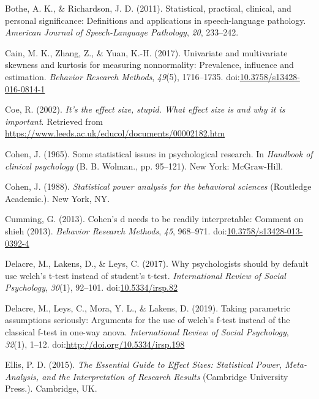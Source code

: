 \documentclass[
  man,floatsintext]{apa6}
\begin{document}
\leavevmode\hypertarget{ref-Bothe_Richardson_2011}{}%
Bothe, A. K., \& Richardson, J. D. (2011). Statistical, practical, clinical, and personal significance: Definitions and applications in speech-language pathology. \emph{American Journal of Speech-Language Pathology}, \emph{20}, 233--242.

\leavevmode\hypertarget{ref-Cain_et_al_2017}{}%
Cain, M. K., Zhang, Z., \& Yuan, K.-H. (2017). Univariate and multivariate skewness and kurtosis for measuring nonnormality: Prevalence, influence and estimation. \emph{Behavior Research Methods}, \emph{49}(5), 1716--1735. doi:\href{https://doi.org/10.3758/s13428-016-0814-1}{10.3758/s13428-016-0814-1}

\leavevmode\hypertarget{ref-Coe_2002}{}%
Coe, R. (2002). \emph{It's the effect size, stupid. What effect size is and why it is important}. Retrieved from \url{https://www.leeds.ac.uk/educol/documents/00002182.htm}

\leavevmode\hypertarget{ref-Cohen_1965}{}%
Cohen, J. (1965). Some statistical issues in psychological research. In \emph{Handbook of clinical psychology} (B. B. Wolman., pp. 95--121). New York: McGraw-Hill.

\leavevmode\hypertarget{ref-Cohen_1988}{}%
Cohen, J. (1988). \emph{Statistical power analysis for the behavioral sciences} (Routledge Academic.). New York, NY.

\leavevmode\hypertarget{ref-Cumming_2013}{}%
Cumming, G. (2013). Cohen's d needs to be readily interpretable: Comment on shieh (2013). \emph{Behavior Research Methods}, \emph{45}, 968--971. doi:\href{https://doi.org/10.3758/s13428-013-0392-4}{10.3758/s13428-013-0392-4}

\leavevmode\hypertarget{ref-Delacre_et_al_2017}{}%
Delacre, M., Lakens, D., \& Leys, C. (2017). Why psychologists should by default use welch's t-test instead of student's t-test. \emph{International Review of Social Psychology}, \emph{30}(1), 92--101. doi:\href{https://doi.org/10.5334/irsp.82}{10.5334/irsp.82}

\leavevmode\hypertarget{ref-Delacre_et_al_2019}{}%
Delacre, M., Leys, C., Mora, Y. L., \& Lakens, D. (2019). Taking parametric assumptions seriously: Arguments for the use of welch's f-test instead of the classical f-test in one-way anova. \emph{International Review of Social Psychology}, \emph{32}(1), 1--12. doi:\href{https://doi.org/http://doi.org/10.5334/irsp.198}{http://doi.org/10.5334/irsp.198}

\leavevmode\hypertarget{ref-Ellis_2015}{}%
Ellis, P. D. (2015). \emph{The Essential Guide to Effect Sizes: Statistical Power, Meta-Analysis, and the Interpretation of Research Results} (Cambridge University Press.). Cambridge, UK.
\end{document}
